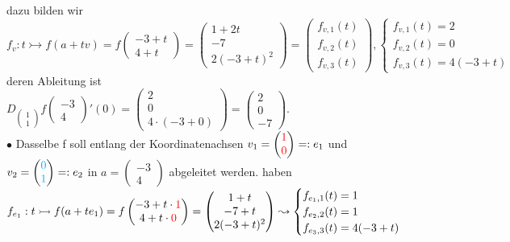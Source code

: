 \documentclass[]{scrartcl}
\begin{document}
	dazu bilden wir $f_v: t\rightarrowtail f(a+tv)= f \begin{pmatrix}
		-3+t\\4+t
	\end{pmatrix}=\begin{pmatrix}
	1+2t\\-7\\2(-3+t)^2
	\end{pmatrix}=\begin{pmatrix}
	f_{v,1}(t)\\f_{v,2}(t)\\f_{v,3}(t)
	\end{pmatrix}, 
	\begin{cases}
	f_{v,1}(t)=2\\f_{v,2}(t)=0\\f_{v,3}(t)=4(-3+t)
	\end{cases}$\\
	deren Ableitung ist\\
	$D_{\begin{pmatrix}
		1\\1
	\end{pmatrix}} f\begin{pmatrix}
	-3\\4
	\end{pmatrix}'(0)=\begin{pmatrix}
	2\\0\\4\cdot(-3+0)
	\end{pmatrix}=\begin{pmatrix}
	2\\0\\-7
	\end{pmatrix}$.\\
	$\bullet$ Dasselbe f soll entlang der Koordinatenachsen $v_1=\begin{pmatrix}
		\textcolor{red}{1}\\\textcolor{red}{0}
	\end{pmatrix}=: e_1$ und $v_2 =\begin{pmatrix}
		\textcolor{cyan}{0}\\\textcolor{cyan}{1}
	\end{pmatrix}=:e_2$ in $ a= \begin{pmatrix}
		-3\\4
	\end{pmatrix}$ abgeleitet werden. haben $f_{e_1}:t \rightarrowtail f(a+t e_1)=f\begin{pmatrix}
		-3+t\cdot\textcolor{red}{1}\\4+t\cdot\textcolor{red}{0}
	\end{pmatrix}=\begin{pmatrix}
		1+t\\-7+t\\2(-3+t)^2
	\end{pmatrix}\leadsto\begin{cases}
	f_{e_1,1}(t)=1\\f_{e_2,2}(t)=1\\f_{e_3,3}(t)=4(-3+t)
	\end{cases}$\\
\end{document}
